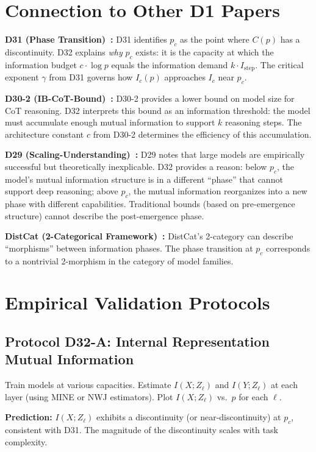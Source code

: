 \documentclass[12pt]{article}
\theoremstyle{definition}
\theoremstyle{remark}
\begin{document}
\section{Connection to Other D1 Papers}

\textbf{D31 (Phase Transition)~\cite{lu2026-d31}:} D31 identifies $p_c$ as the point where $C(p)$ has a discontinuity. D32 explains \emph{why} $p_c$ exists: it is the capacity at which the information budget $c \cdot \log p$ equals the information demand $k \cdot I_{\mathrm{step}}$. The critical exponent $\gamma$ from D31 governs how $I_c(p)$ approaches $I_c$ near $p_c$.

\textbf{D30-2 (IB-CoT-Bound)~\cite{lu2026-d30-2}:} D30-2 provides a lower bound on model size for CoT reasoning. D32 interprets this bound as an information threshold: the model must accumulate enough mutual information to support $k$ reasoning steps. The architecture constant $c$ from D30-2 determines the efficiency of this accumulation.

\textbf{D29 (Scaling-Understanding)~\cite{lu2026-d29}:} D29 notes that large models are empirically successful but theoretically inexplicable. D32 provides a reason: below $p_c$, the model's mutual information structure is in a different ``phase'' that cannot support deep reasoning; above $p_c$, the mutual information reorganizes into a new phase with different capabilities. Traditional bounds (based on pre-emergence structure) cannot describe the post-emergence phase.

\textbf{DistCat (2-Categorical Framework)~\cite{lu2026-distcat}:} DistCat's 2-category can describe ``morphisms'' between information phases. The phase transition at $p_c$ corresponds to a nontrivial 2-morphism in the category of model families.

\section{Empirical Validation Protocols}

\subsection{Protocol D32-A: Internal Representation Mutual Information}

Train models at various capacities. Estimate $I(X; Z_\ell)$ and $I(Y; Z_\ell)$ at each layer (using MINE or NWJ estimators). Plot $I(X; Z_\ell)$ vs.\ $p$ for each $\ell$.

\textbf{Prediction:} $I(X; Z_\ell)$ exhibits a discontinuity (or near-discontinuity) at $p_c$, consistent with D31. The magnitude of the discontinuity scales with task complexity.
\end{document}
